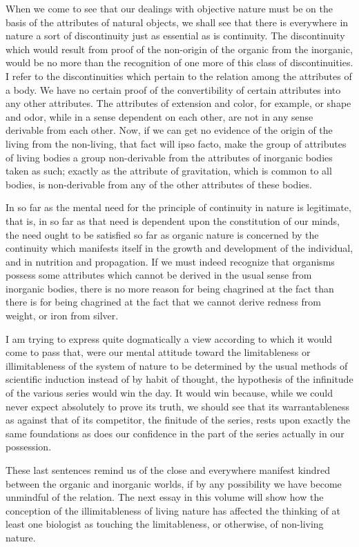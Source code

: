 \documentclass[a4paper, 11pt, oneside, polutonikogreek, english, landscape]{article}
\begin{document}
When we come to see that our dealings with objective nature must be on the basis of the attributes of natural objects, we shall see that there is everywhere in nature a sort of discontinuity just as essential as is continuity. The discontinuity which would result from proof of the non-origin of the organic from the inorganic, would be no more than the recognition of one more of this class of discontinuities. I refer to the discontinuities which pertain to the relation among the attributes of a body. We have no certain proof of the convertibility of certain attributes into any other attributes. The attributes of extension and color, for example, or shape and odor, while in a sense dependent on each other, are not in any sense derivable from each other. Now, if we can get no evidence of the origin of the living from the non-living, that fact will ipso facto, make the group of attributes of living bodies a group non-derivable from the attributes of inorganic bodies taken as such; exactly as the attribute of gravitation, which is common to all bodies, is non-derivable from any of the other attributes of these bodies.

In so far as the mental need for the principle of continuity in nature is legitimate, that is, in so far as that need is dependent upon the constitution of our minds, the need ought to be satisfied so far as organic nature is concerned by the continuity which manifests itself in the growth and development of the individual, and in nutrition and propagation. If we must indeed recognize that organisms possess some attributes which cannot be derived in the usual sense from inorganic bodies, there is no more reason for being chagrined at the fact than there is for being chagrined at the fact that we cannot derive redness from weight, or iron from silver.

I am trying to express quite dogmatically a view according to which it would come to pass that, were our mental attitude toward the limitableness or illimitableness of the system of nature to be determined by the usual methods of scientific induction instead of by habit of thought, the hypothesis of the infinitude of the various series would win the day. It would win because, while we could never expect absolutely to prove its truth, we should see that its warrantableness as against that of its competitor, the finitude of the series, rests upon exactly the same foundations as does our confidence in the part of the series actually in our possession.

These last sentences remind us of the close and everywhere manifest kindred between the organic and inorganic worlds, if by any possibility we have become unmindful of the relation. The next essay in this volume will show how the conception of the illimitableness of living nature has affected the thinking of at least one biologist as touching the limitableness, or otherwise, of non-living nature.
\clearpage
\end{document}
